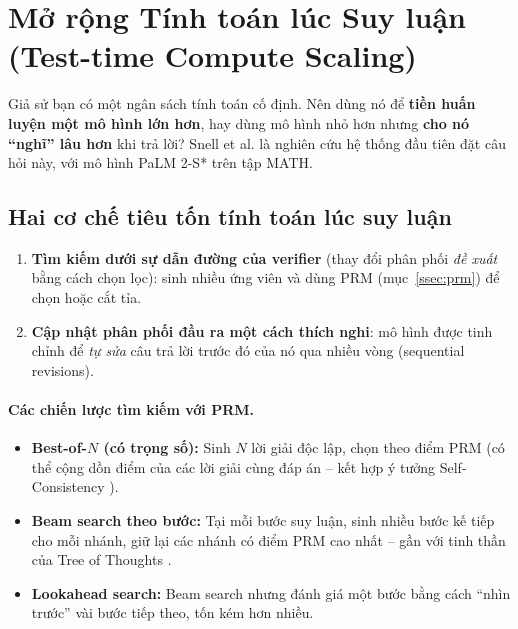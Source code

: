 
\section{Mở rộng Tính toán lúc Suy luận (Test-time Compute Scaling) \newtag}
\label{sec:test_time_compute}

Giả sử bạn có một ngân sách tính toán cố định. Nên dùng nó để \textbf{tiền huấn luyện một mô hình lớn hơn}, hay dùng mô hình nhỏ hơn nhưng \textbf{cho nó “nghĩ” lâu hơn} khi trả lời? Snell et al. \cite{snell2024scaling} là nghiên cứu hệ thống đầu tiên đặt câu hỏi này, với mô hình PaLM 2-S* trên tập MATH.

\subsection{Hai cơ chế tiêu tốn tính toán lúc suy luận}
\label{ssec:ttc_mechanisms}
\begin{enumerate}
	\item \textbf{Tìm kiếm dưới sự dẫn đường của verifier} (thay đổi phân phối \emph{đề xuất} bằng cách chọn lọc): sinh nhiều ứng viên và dùng PRM (mục~\ref{ssec:prm}) để chọn hoặc cắt tỉa.
	\item \textbf{Cập nhật phân phối đầu ra một cách thích nghi}: mô hình được tinh chỉnh để \emph{tự sửa} câu trả lời trước đó của nó qua nhiều vòng (sequential revisions).
\end{enumerate}

\paragraph{Các chiến lược tìm kiếm với PRM.}
\begin{itemize}
	\item \textbf{Best-of-$N$ (có trọng số):} Sinh $N$ lời giải độc lập, chọn theo điểm PRM (có thể cộng dồn điểm của các lời giải cùng đáp án -- kết hợp ý tưởng Self-Consistency \cite{wang2022self}).
	\item \textbf{Beam search theo bước:} Tại mỗi bước suy luận, sinh nhiều bước kế tiếp cho mỗi nhánh, giữ lại các nhánh có điểm PRM cao nhất -- gần với tinh thần của Tree of Thoughts \cite{yao2023tree}.
	\item \textbf{Lookahead search:} Beam search nhưng đánh giá một bước bằng cách “nhìn trước” vài bước tiếp theo, tốn kém hơn nhiều.
\end{itemize}

